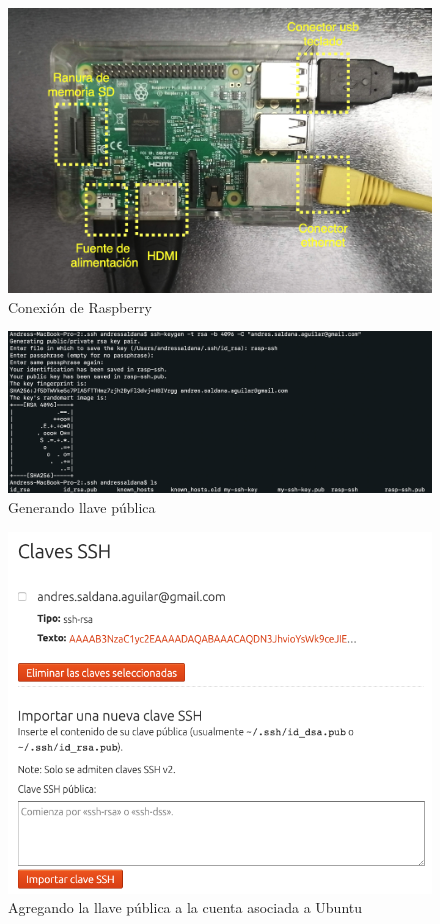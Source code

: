 \begin{figure}[H]
	\centering
	\includegraphics[scale=.25]{Capitulo5/images/rasp.png}
	\caption{Conexión de Raspberry}
	\label{fig:conexion}
\end{figure} 

\begin{figure}[H]
	\centering
	\includegraphics[scale=.3]{Capitulo5/images/ssh_keygen.png}
	\caption{Generando llave pública}
	\label{fig:llave}
\end{figure} 

\begin{figure}[H]
	\centering
	\includegraphics[scale=.3]{Capitulo5/images/sshkey.png}
	\caption{Agregando la llave pública a la cuenta asociada a Ubuntu}
	\label{fig:ubuntullave}
\end{figure} 

